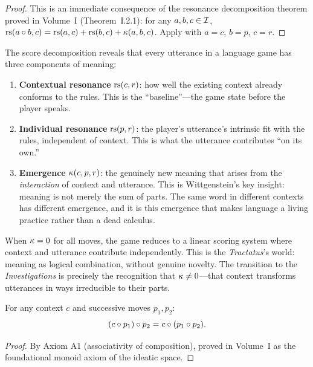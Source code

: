 \begin{proof}
This is an immediate consequence of the resonance decomposition theorem
proved in Volume~I (Theorem~I.2.1): for any $a, b, c \in \mathcal{I}$,
$\mathrm{rs}(a \circ b, c) = \mathrm{rs}(a,c) + \mathrm{rs}(b,c) + \kappa(a,b,c)$.
Apply with $a = c$, $b = p$, $c = r$.
\end{proof}

\begin{interpretation}
\label{interp:three-components}
The score decomposition reveals that every utterance in a language game has
three components of meaning:
\begin{enumerate}
\item \textbf{Contextual resonance} $\mathrm{rs}(c, r)$: how well the existing context
already conforms to the rules. This is the ``baseline''---the game state before
the player speaks.
\item \textbf{Individual resonance} $\mathrm{rs}(p, r)$: the player's utterance's
intrinsic fit with the rules, independent of context. This is what the utterance
contributes ``on its own.''
\item \textbf{Emergence} $\kappa(c, p, r)$: the genuinely new meaning that
arises from the \emph{interaction} of context and utterance. This is Wittgenstein's
key insight: meaning is not merely the sum of parts. The same word in different
contexts has different emergence, and it is this emergence that makes language a
living practice rather than a dead calculus.
\end{enumerate}
When $\kappa = 0$ for all moves, the game reduces to a linear scoring system
where context and utterance contribute independently. This is the
\textit{Tractatus}'s world: meaning as logical combination, without genuine
novelty. The transition to the \textit{Investigations} is precisely the
recognition that $\kappa \neq 0$---that context transforms utterances in
ways irreducible to their parts.
\end{interpretation}

\begin{theorem}
\label{thm:sequential-assoc}
For any context $c$ and successive moves $p_1, p_2$:
\[
(c \circ p_1) \circ p_2 = c \circ (p_1 \circ p_2).
\]
\end{theorem}

\begin{proof}
By Axiom A1 (associativity of composition), proved in Volume~I as the
foundational monoid axiom of the ideatic space.
\end{proof}

